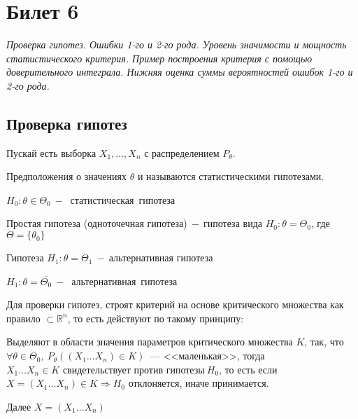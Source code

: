 \section{Билет 6}

\begin{center}
    \it
    Проверка гипотез.
    Ошибки 1-го и 2-го рода.
    Уровень значимости и мощность статистического критерия.
    Пример построения критерия с помощью доверительного интеграла.
    Нижняя оценка суммы вероятностей ошибок 1-го и 2-го рода.
\end{center}

\subsection{Проверка гипотез}

Пускай есть выборка $X_1,\ldots,X_n$ с распределением $P_{\theta}$.

\begin{definition*}
Предположения о значениях $\theta$ и называются статистическими гипотезами. 
\end{definition*}
\begin{example}
$H_0\colon\theta\in\Theta_0~-~$ статистическая\ гипотеза
\end{example}
\begin{definition*}
Простая гипотеза (одноточечная гипотеза)$~-~$гипотеза вида $H_{0}\colon\theta=\Theta_0$, где $\Theta=\{\theta_0\}$
\end{definition*}
\begin{definition*}Гипотеза $H_{1}\colon\theta=\Theta_1~-~$альтернативная гипотеза
\end{definition*}
\begin{example}
$H_1\colon\theta=\overline{\Theta_0}~-~$ альтернативная\ гипотеза
\end{example}

Для проверки гипотез, строят критерий на основе критического множества как правило $\subset \mathbb{R}^n$, то есть действуют по такому принципу:

Выделяют в области значения параметров критического множества $K$, так, что $\forall \theta \in\Theta_0,\ P_\theta((X_1\ldots X_n)\in K)~$ --- <<маленькая>>, тогда 
$X_1\ldots X_n\in K\text{ свидетельствует против гипотезы}\ H_0$, то есть если $X=(X_1\ldots X_n)\in K\Rightarrow H_0$ отклоняется, иначе принимается.

Далее $X=(X_1\ldots X_n)$ 
